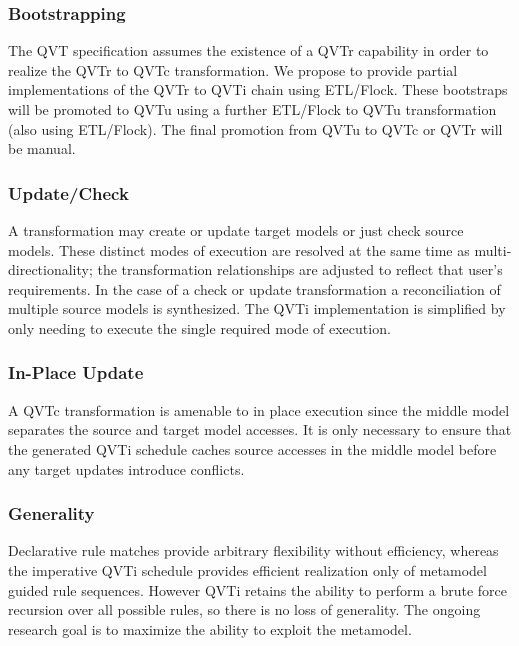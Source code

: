 \subsubsection{Bootstrapping}

The QVT specification assumes the existence of a QVTr capability in order to realize the QVTr to QVTc transformation. We propose to provide partial implementations of the QVTr to QVTi chain using ETL/Flock\cite{Paige.etal2009}. These bootstraps will be promoted to QVTu using a further ETL/Flock to QVTu transformation (also using ETL/Flock). The final promotion from QVTu to QVTc or QVTr will be manual.

\subsubsection{Update/Check}

A transformation may create or update target models or just check source models. These distinct modes of execution are resolved at the same time as multi-directionality; the transformation relationships are adjusted to reflect that user's requirements. In the case of a check or update transformation a reconciliation of multiple source models is synthesized. The QVTi implementation is simplified by only needing to execute the single required mode of execution.

\subsubsection{In-Place Update}

A QVTc transformation is amenable to in place execution since the middle model separates the source and target model accesses. It is only necessary to ensure that the generated QVTi schedule caches source accesses in the middle model before any target updates introduce conflicts.

\subsubsection{Generality}

Declarative rule matches provide arbitrary flexibility without efficiency, whereas the imperative QVTi schedule provides efficient realization only of metamodel guided rule sequences. However QVTi retains the ability to perform a brute force recursion over all possible rules, so there is no loss of generality. The ongoing research goal is to maximize the ability to exploit the metamodel.

